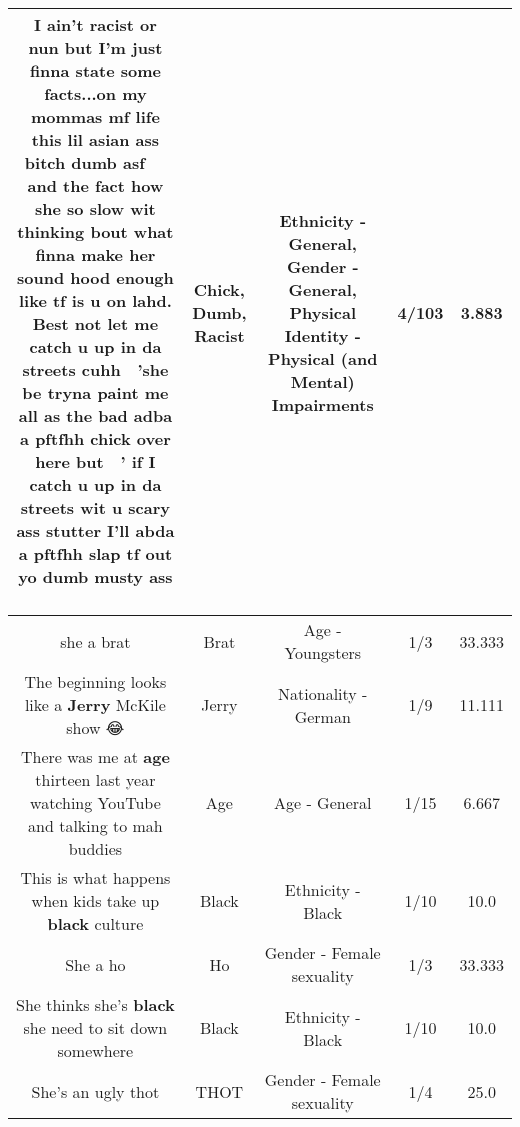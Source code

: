 \documentclass[11pt]{article}
\newlength\mylength
\begin{document}
\begin{center}
\begin{longtable}{|C{.65\mylength}|C{.30\mylength}|C{.12\mylength}|C{.12\mylength}|C{.12\mylength}|}
  \small I ain't \textbf{racist} or nun but I'm just finna state some facts...on my mommas mf life this lil asian ass bitch \textbf{dumb} asf 🚫 🧢 and the fact how she so slow wit thinking bout what finna make her sound hood enough like tf is u on lahd. Best not let me catch u up in da streets cuhh 💯 'she be tryna paint me all as the bad adba a pftfhh \textbf{chick} over here but 🍯 ' if I catch u up in da streets wit u scary ass stutter I'll abda a pftfhh slap tf out yo \textbf{dumb} musty ass 🤦🏾‍♀️\normalsize   & Chick, Dumb, Racist & Ethnicity - General, Gender - General, Physical Identity - Physical (and Mental) Impairments & 4/103 & 3.883 \\  \hline
  \small she a brat\normalsize   & Brat & Age - Youngsters & 1/3 & 33.333 \\  \hline
  \small The beginning looks like a \textbf{Jerry} McKile show 😂\normalsize   & Jerry & Nationality - German & 1/9 & 11.111 \\  \hline
  \small There was me at \textbf{age} thirteen last year watching YouTube and talking to mah buddies\normalsize   & Age & Age - General & 1/15 & 6.667 \\  \hline
  \small This is what happens when kids take up \textbf{black} culture\normalsize   & Black & Ethnicity - Black & 1/10 & 10.0 \\  \hline
  \small She a ho\normalsize   & Ho & Gender - Female sexuality & 1/3 & 33.333 \\  \hline
  \small She thinks she's \textbf{black} she need to sit down somewhere\normalsize   & Black & Ethnicity - Black & 1/10 & 10.0 \\  \hline
  \small She's an ugly thot\normalsize   & THOT & Gender - Female sexuality & 1/4 & 25.0 \\  \hline

\end{longtable}
\end{center}
\end{document}
